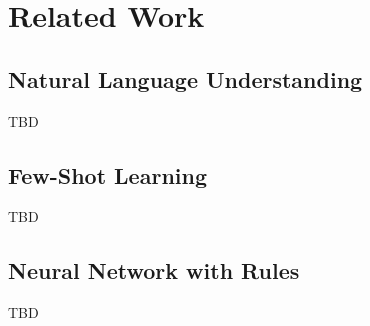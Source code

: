 \section{Related Work}
\subsection{Natural Language Understanding}
TBD

\subsection{Few-Shot Learning}
TBD

\subsection{Neural Network with Rules}
TBD

